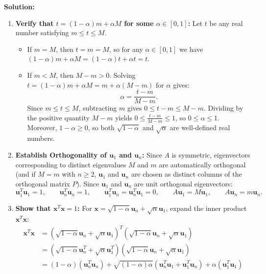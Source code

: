 \documentclass[11pt, letterpaper]{article}
\theoremstyle{definition}
\theoremstyle{remark}
\begin{document}
\textbf{Solution:}
\begin{enumerate}[label=\textbf{Step \arabic*:}]
    \item \textbf{Verify that $t = (1-\alpha)m + \alpha M$ for some $\alpha \in [0, 1]$:}
    Let $t$ be any real number satisfying $m \le t \le M$.
    \begin{itemize}
        \item If $m = M$, then $t = m = M$, so for any $\alpha \in [0, 1]$ we have $(1-\alpha)m + \alpha M = (1-\alpha)t + \alpha t = t$.
        \item If $m < M$, then $M - m > 0$. Solving $t = (1-\alpha)m + \alpha M = m + \alpha(M - m)$ for $\alpha$ gives:
        \[
        \alpha = \frac{t - m}{M - m}.
        \]
        Since $m \le t \le M$, subtracting $m$ gives $0 \le t - m \le M - m$. Dividing by the positive quantity $M - m$ yields $0 \le \frac{t-m}{M-m} \le 1$, so $0 \le \alpha \le 1$. Moreover, $1 - \alpha \ge 0$, so both $\sqrt{1-\alpha}$ and $\sqrt{\alpha}$ are well-defined real numbers.
    \end{itemize}
    \item \textbf{Establish Orthogonality of $\mathbf{u}_1$ and $\mathbf{u}_n$:}
    Since $A$ is symmetric, eigenvectors corresponding to distinct eigenvalues $M$ and $m$ are automatically orthogonal (and if $M = m$ with $n \ge 2$, $\mathbf{u}_1$ and $\mathbf{u}_n$ are chosen as distinct columns of the orthogonal matrix $P$). Since $\mathbf{u}_1$ and $\mathbf{u}_n$ are unit orthogonal eigenvectors:
    \[
    \mathbf{u}_1^T \mathbf{u}_1 = 1, \qquad \mathbf{u}_n^T \mathbf{u}_n = 1, \qquad \mathbf{u}_1^T \mathbf{u}_n = \mathbf{u}_n^T \mathbf{u}_1 = 0, \qquad A\mathbf{u}_1 = M\mathbf{u}_1, \qquad A\mathbf{u}_n = m\mathbf{u}_n.
    \]
    \item \textbf{Show that $\mathbf{x}^T\mathbf{x} = 1$:}
    For $\mathbf{x} = \sqrt{1-\alpha}\mathbf{u}_n + \sqrt{\alpha}\mathbf{u}_1$, expand the inner product $\mathbf{x}^T\mathbf{x}$:
    \begin{align*}
    \mathbf{x}^T \mathbf{x} &= \left(\sqrt{1-\alpha}\mathbf{u}_n + \sqrt{\alpha}\mathbf{u}_1\right)^T \left(\sqrt{1-\alpha}\mathbf{u}_n + \sqrt{\alpha}\mathbf{u}_1\right) \\
    &= \left(\sqrt{1-\alpha}\mathbf{u}_n^T + \sqrt{\alpha}\mathbf{u}_1^T\right) \left(\sqrt{1-\alpha}\mathbf{u}_n + \sqrt{\alpha}\mathbf{u}_1\right) \\
    &= (1-\alpha)(\mathbf{u}_n^T \mathbf{u}_n) + \sqrt{(1-\alpha)\alpha}(\mathbf{u}_n^T \mathbf{u}_1 + \mathbf{u}_1^T \mathbf{u}_n) + \alpha(\mathbf{u}_1^T \mathbf{u}_1) \\

\end{align*}
\end{enumerate}
\end{document}
